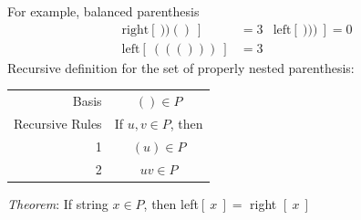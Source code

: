 For example, balanced parenthesis
\begin{align*}
  \text{right}[~))()~]  & = 3 & \text{left}[~)))~] = 0 \\
  \text{left}[~((()))~] & = 3
\end{align*}
Recursive definition for the set of properly nested parenthesis:
\begin{center}
  \begin{tabular}{r|c}
    Basis           & $()\in P$           \\
    Recursive Rules & If $u,v\in P$, then \\
    1               & $(u) \in P$         \\
    2               & $uv \in P$
  \end{tabular}
\end{center}
\textit{Theorem}: If string $x\in P$, then left$[~x~] =$ right $[~x~]$
